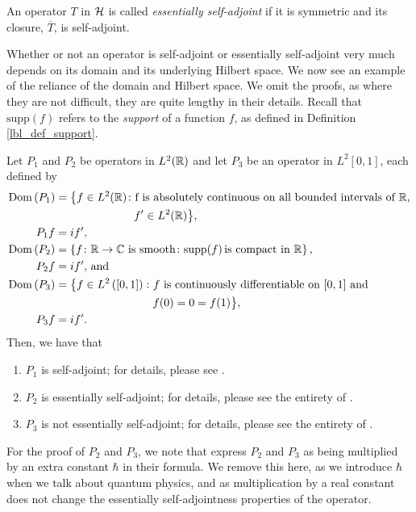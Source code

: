 \begin{definition}
  An operator $T$ in $\mathcal{H}$ is called {\emph{essentially self-adjoint}} if it is symmetric and its closure, $\overline{T}$, is self-adjoint.
\end{definition}

Whether or not an operator is self-adjoint or essentially self-adjoint very much depends on its domain and its underlying Hilbert space. We now see an example of the reliance of the domain and Hilbert space. We omit the proofs, as where they are not difficult, they are quite lengthy in their details. Recall that $\text{supp}(f)$ refers to the {\emph{support}} of a function $f$, as defined in Definition \eqref{lbl_def_support}.

\begin{example} \label{lbl_example_sa_esa_not_esa}
    Let $P_1$ and $P_2$ be operators in $L^2(\mathbb{R})$ and let $P_3$ be an operator in $L^2[0,1]$, each defined by
    \begin{align*}
      \operatorname{Dom}\left(P_1\right)
        &= \big\{f \in L^2(\mathbb{R}) \colon \text{f is absolutely continuous on all bounded intervals of $\mathbb{R}$,}\\&\qquad\qquad\qquad\quad \text{$f' \in L^2(\mathbb{R})$}\big\}, \\
        P_1 f &= i f', \\
      \operatorname{Dom}\left(P_2\right)
        &= \left\{f \colon \mathbb{R} \to \mathbb{C} \,\,\text{is smooth} \colon \text{supp}(f) \,\text{is compact in $\mathbb{R}$} \right\}, \\
        P_2 f &= i f' ,\,\text{and}\\
      \operatorname{Dom}\left(P_3\right)
        &= \big\{f \in L^2\left([0,1]\right) \colon \text{$f$ is continuously differentiable on $[0,1]$ and}\\&\qquad\qquad\qquad\qquad\,\,\,\,\text{$f(0)=0=f(1)$}\big\}, \\
        P_3 f &= i f'.
    \end{align*}
    Then, we have that
    \begin{enumerate}[label = (\alph*)]
      \item $P_1$ is self-adjoint; for details, please see {\cite[Example 6.1]{conway}}.
      \item $P_2$ is essentially self-adjoint; for details, please see the entirety of {\cite[Chapter 9.7]{Hall2013}}.
      \item $P_3$ is not essentially self-adjoint; for details, please see the entirety of {\cite[Chapter 9.6]{Hall2013}}.
    \end{enumerate}
    For the proof of $P_2$ and $P_3$, we note that {\cite[Proposition 9,26, 9.29]{Hall2013}} express $P_2$ and $P_3$ as being multiplied by an extra constant $\hbar$ in their formula. We remove this here, as we introduce $\hbar$ when we talk about quantum physics, and as multiplication by a real constant does not change the essentially self-adjointness properties of the operator.
\end{example}

